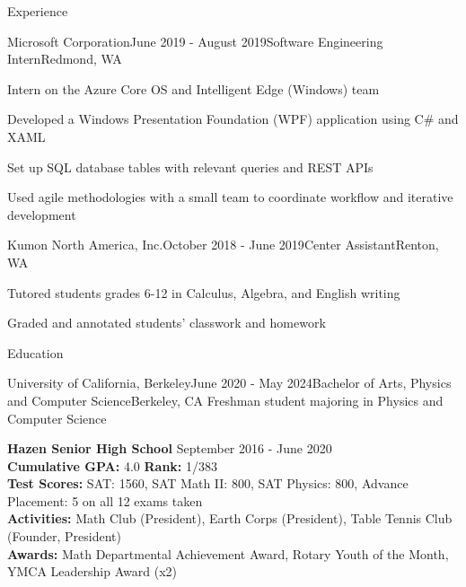 \documentclass{resume} %
\begin{document}

\begin{rSection}{Experience}

\begin{rSubsection}{Microsoft Corporation}{June 2019 - August 2019}{Software Engineering Intern}{Redmond, WA}
\item Intern on the Azure Core OS and Intelligent Edge (Windows) team
\item Developed a Windows Presentation Foundation (WPF) application using C\# and XAML
\item Set up SQL database tables with relevant queries and REST APIs
\item Used agile methodologies with a small team to coordinate workflow and iterative development
\end{rSubsection}


\begin{rSubsection}{Kumon North America, Inc.}{October 2018 - June 2019}{Center Assistant}{Renton, WA}
\item Tutored students grades 6-12 in Calculus, Algebra, and English writing
\item Graded and annotated students' classwork and homework
\end{rSubsection}

\end{rSection}


\begin{rSection}{Education}
    \begin{rSubsection}{University of California, Berkeley}{June 2020 - May 2024}{Bachelor of Arts, Physics and Computer Science}{Berkeley, CA}
        Freshman student majoring in Physics and Computer Science
        \end{rSubsection}

{\bf Hazen Senior High School} \hfill {September 2016 - June 2020}\\
{\bf Cumulative GPA:} 4.0 {\bf Rank:} 1/383 \smallskip \\
{\bf Test Scores:} SAT: 1560, SAT Math II: 800, SAT Physics: 800, Advance Placement: 5 on all 12 exams taken \\
{\bf Activities:} Math Club (President), Earth Corps (President), Table Tennis Club (Founder, President)\\
{\bf Awards:} Math Departmental Achievement Award, Rotary Youth of the Month, YMCA Leadership Award (x2)
\end{rSection}
\end{document}
